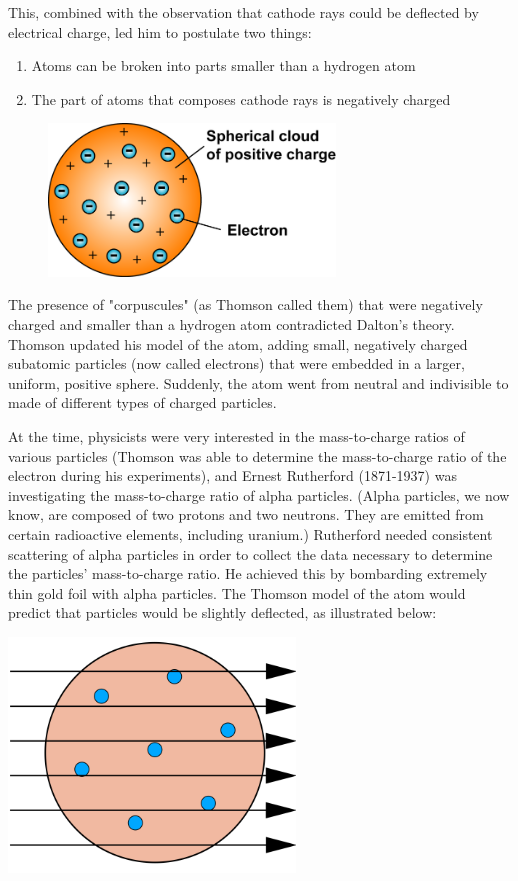 This, combined with the observation that cathode rays could be deflected by
electrical charge, led him to postulate two things:

\begin{enumerate}
\item Atoms can be broken into parts smaller than a hydrogen atom
\item The part of atoms that composes cathode rays is negatively charged
\end{enumerate}

\begin{figure}
\noindent\includegraphics[width=3in]{thomson_model.png}
\end{figure}

The presence of "corpuscules" (as Thomson called them) that were negatively
charged and smaller than a hydrogen atom contradicted Dalton's theory. Thomson
updated his model of the atom, adding small, negatively charged subatomic
particles (now called electrons) that were embedded in a larger, uniform, positive
sphere. Suddenly, the atom went from neutral and indivisible to made of different
types of charged particles.

At the time, physicists were very interested in the mass-to-charge ratios of
various particles (Thomson was able to determine the mass-to-charge ratio of the
electron during his experiments), and Ernest Rutherford (1871-1937) was
investigating the mass-to-charge ratio of alpha particles. (Alpha particles, we
now know, are composed of two protons and two neutrons. They are emitted from
certain radioactive elements, including uranium.) Rutherford needed consistent
scattering of alpha particles in order to collect the data necessary to determine
the particles' mass-to-charge ratio. He achieved this by bombarding extremely
thin gold foil with alpha particles. The Thomson model of the atom would predict
that particles would be slightly deflected, as illustrated below:

\begin{center}
\includegraphics[width=3in]{thomson_gold.png}
\end{center}

